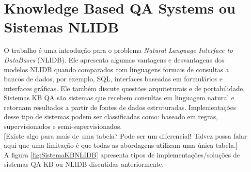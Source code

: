 \documentclass{article}
\begin{document}







\section{Knowledge Based QA Systems\label{sistemasKB} ou Sistemas NLIDB}

O trabalho \citep{androutsopoulos1995natural} é uma introdução para o problema \textit{Natural Language Interface to DataBases} (NLIDB). Ele apresenta algumas vantagens e desvantagens dos modelos NLIDB quando comparados com linguagens formais de consultas a bancos de dados, por exemplo, SQL, interfaces baseadas em formulários e interfaces gráficas. Ele também discute questões arquiteturais e de portabilidade. \\

Sistemas KB QA são sistemas que recebem consultas em linguagem natural e retornam resultados a partir de fontes de dados estruturadas. Implementações desse tipo de sistemas podem ser classificadas como: baseado em regras, supervisionados e semi-supervisionados\citep{speech}.\\

[Existe algo para mais de uma tabela? Pode ser um diferencial! Talvez possa falar aqui que uma limitação é que todas as abordagens utilizam uma única tabela.]\\

A figura \ref{fig:SistemaKBNLIDB} apresenta tipos de implementações/soluções de sistemas QA KB ou NLIDB discutidas anteriormente.
\end{document}
